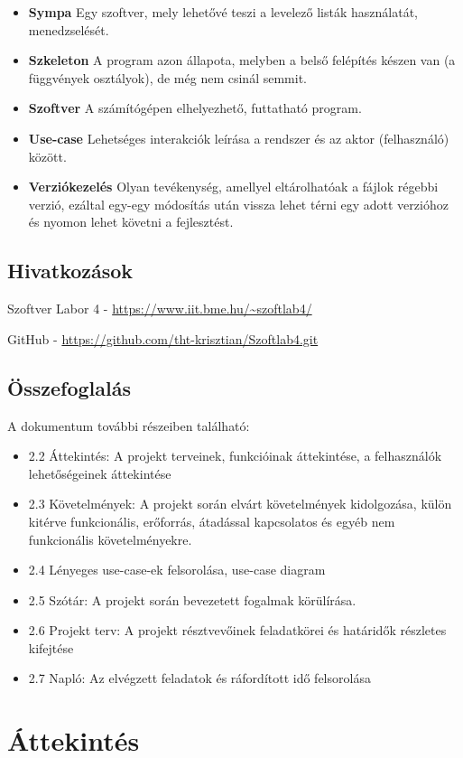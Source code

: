 \begin{itemize}
\item \textbf{Sympa}	Egy szoftver, mely lehetővé teszi a levelező listák használatát, menedzselését.
\item \textbf{Szkeleton}	A program azon állapota, melyben a belső felépítés készen van (a függvények osztályok), de még nem csinál semmit.
\item \textbf{Szoftver}	A számítógépen elhelyezhető, futtatható program.
\item \textbf{Use-case}	Lehetséges interakciók leírása a rendszer és az aktor (felhasználó) között.
\item \textbf{Verziókezelés}		Olyan tevékenység, amellyel eltárolhatóak a fájlok régebbi verzió, ezáltal egy-egy módosítás után vissza lehet térni egy adott verzióhoz és nyomon lehet követni a fejlesztést.

\end{itemize}

\subsection {Hivatkozások}
Szoftver Labor 4 - \url{https://www.iit.bme.hu/~szoftlab4/}

GitHub - \url{https://github.com/tht-krisztian/Szoftlab4.git}

\subsection{Összefoglalás}
A dokumentum további részeiben található:
\begin{itemize}
\item 2.2 Áttekintés: A projekt terveinek, funkcióinak áttekintése, a felhasználók lehetőségeinek áttekintése
\item 2.3 Követelmények: A projekt során elvárt követelmények kidolgozása, külön kitérve funkcionális, erőforrás, átadással kapcsolatos és egyéb nem funkcionális követelményekre.
\item 2.4 Lényeges use-case-ek felsorolása, use-case diagram
\item 2.5 Szótár: A projekt során bevezetett fogalmak körülírása.
\item 2.6 Projekt terv: A projekt résztvevőinek feladatkörei és határidők részletes kifejtése
\item 2.7 Napló: Az elvégzett feladatok és ráfordított idő felsorolása
\end{itemize}
\pagebreak

\section{Áttekintés}
